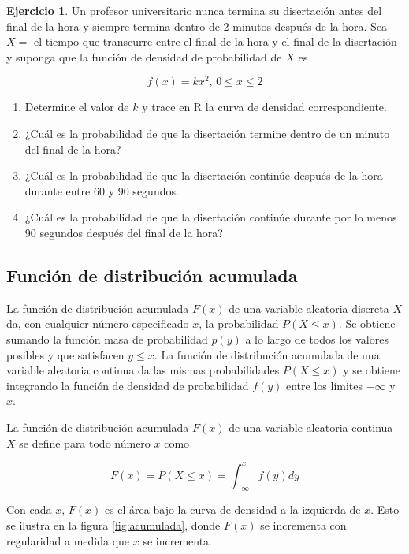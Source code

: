 \documentclass[
  11pt,
]{book}
\theoremstyle{definition}
\theoremstyle{definition}
\theoremstyle{definition}
\newtheorem{exercise}{Ejercicio}[chapter]
\theoremstyle{definition}
\theoremstyle{remark}
\begin{document}
\begin{exercise}

Un profesor universitario nunca termina su disertación antes del final de la hora y siempre termina dentro de 2 minutos después de la hora. Sea \(X =\) el tiempo que transcurre entre el final de la hora y el final de la disertación y suponga que la función de densidad de probabilidad de \(X\) es

\[f(x) = kx^2 \text{, } 0\leq x \leq 2\]

\begin{enumerate}
\def\labelenumi{\alph{enumi}.}
\item
  Determine el valor de \(k\) y trace en R la curva de densidad correspondiente.
\item
  ¿Cuál es la probabilidad de que la disertación termine dentro de un minuto del final de la hora?
\item
  ¿Cuál es la probabilidad de que la disertación continúe después de la hora durante entre 60 y 90 segundos.
\item
  ¿Cuál es la probabilidad de que la disertación continúe durante por lo menos 90 segundos después del final de la hora?
\end{enumerate}

\end{exercise}

\subsection{Función de distribución acumulada}\label{funciuxf3n-de-distribuciuxf3n-acumulada-1}

La función de distribución acumulada \(F(x)\) de una variable aleatoria discreta \(X\) da, con cualquier número especificado \(x\), la probabilidad \(P(X \leq x)\). Se obtiene sumando la función masa de probabilidad \(p(y)\) a lo largo de todos los valores posibles y que satisfacen \(y \leq x\). La función de distribución acumulada de una variable aleatoria continua da las mismas probabilidades \(P(X \leq x)\) y se obtiene integrando la función de densidad de probabilidad \(f(y)\) entre los límites \(-\infty\) y \(x\).

La función de distribución acumulada \(F(x)\) de una variable aleatoria continua \(X\) se define para todo número \(x\) como

\[
F(x) =P(X\leq x) = \int_{-\infty}^xf(y)dy
\]

Con cada \(x\), \(F(x)\) es el área bajo la curva de densidad a la izquierda de \(x\). Esto se ilustra en la figura \ref{fig:acumulada}, donde \(F(x)\) se incrementa con regularidad a medida que \(x\) se incrementa.
\end{document}
